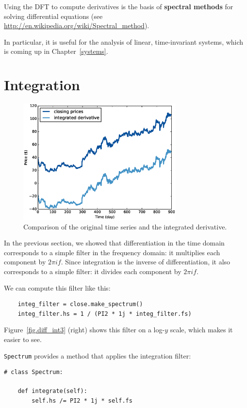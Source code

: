 \documentclass[12pt]{book}
\begin{document}
Using the DFT to compute derivatives is the basis of {\bf spectral
  methods} for solving differential equations (see
\url{http://en.wikipedia.org/wiki/Spectral_method}).

In particular, it is useful for the analysis of linear, time-invariant
systems, which is coming up in Chapter~\ref{systems}.


\section{Integration}

\begin{figure}
\centerline{\includegraphics[height=2.5in]{figs/diff_int5.eps}}
\caption{Comparison of the original time series and the integrated
derivative.}
\label{fig.diff_int5}
\end{figure}

In the previous section, we showed that differentiation in the time
domain corresponds to a simple filter in the frequency domain: it
multiplies each component by $2 \pi i f$.  Since integration is
the inverse of differentiation, it also corresponds to a simple
filter: it divides each component by $2 \pi i f$.

We can compute this filter like this:

\begin{verbatim}
    integ_filter = close.make_spectrum()
    integ_filter.hs = 1 / (PI2 * 1j * integ_filter.fs)
\end{verbatim}

Figure~\ref{fig.diff_int3} (right) shows this filter on a log-$y$ scale,
which makes it easier to see.

{\tt Spectrum} provides a method that applies the integration filter:

\begin{verbatim}
# class Spectrum:

    def integrate(self):
        self.hs /= PI2 * 1j * self.fs
\end{verbatim}
\end{document}
